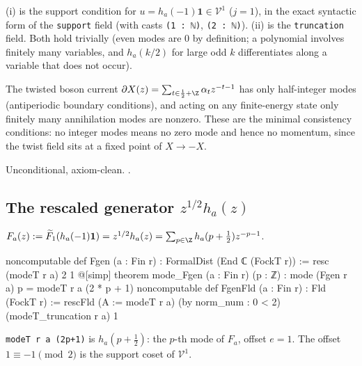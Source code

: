 \begin{dictionary}
(i) is the support condition for $u = h_a(-1)\mathbf 1\in\mathcal V^1$ ($j=1$), in the exact
syntactic form of the \verb|support| field (with casts \verb|(1 : ℕ)|, \verb|(2 : ℕ)|).
(ii) is the \verb|truncation| field. Both hold trivially (even modes are $0$ by definition; a
polynomial involves finitely many variables, and $h_a(k/2)$ for large odd $k$ differentiates
along a variable that does not occur).
\end{dictionary}

\begin{physics}
The twisted boson current $\partial X(z)=\sum_{t\in\frac12+\Z}\alpha_tz^{-t-1}$ has only half-integer modes (antiperiodic boundary conditions), and acting on any finite-energy state only finitely many annihilation modes are nonzero. These are the minimal consistency conditions: no integer modes means no zero mode and hence no momentum, since the twist field sits at a fixed point of $X\to-X$.
\end{physics}

\begin{status}
Unconditional, axiom-clean. .
\end{status}

\subsection{The rescaled generator \texorpdfstring{$z^{1/2}h_a(z)$}{z^(1/2)h(z)}}

\begin{definition}\label{ch07:def:Fgen}
$F_a(z) := \chsevenF_1(h_a(-1)\mathbf 1) = z^{1/2}h_a(z) = \sum_{p\in\Z}h_a(p+\tfrac12)z^{-p-1}$.
\end{definition}

\begin{leancode}
noncomputable def Fgen (a : Fin r) : FormalDist (End ℂ (FockT r)) := resc (modeT r a) 2 1
@[simp] theorem mode_Fgen (a : Fin r) (p : ℤ) : mode (Fgen r a) p = modeT r a (2 * p + 1)
noncomputable def FgenFld (a : Fin r) : Fld (FockT r) :=
  rescFld (A := modeT r a) (by norm_num : 0 < 2) (modeT_truncation r a) 1
\end{leancode}

\begin{dictionary}
\verb|modeT r a (2p+1)| is $h_a(p+\frac12)$: the $p$-th mode of $F_a$, offset $e=1$. The
offset $1\equiv -1\pmod2$ is the support coset of $\mathcal V^1$.
\end{dictionary}

